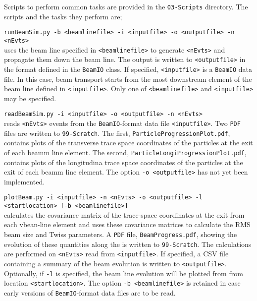 Scripts to perform common tasks are provided in
the \texttt{03-Scripts} directory.  
The scripts and the tasks they perform are;
\begin{description}
  \item{\texttt{runBeamSim.py -b <beamlinefile> -i <inputfile> -o <outputfile> -n <nEvts>}} \\
    uses the beam line specified in \texttt{<beamlinefile>} to
    generate \texttt{<nEvts>} and propagate them down the beam line.
    The output is written to \texttt{<outputfile>} in the format
    defined in the \texttt{BeamIO} class.
    If specified, \texttt{<inputfile>} is a \texttt{BeamIO} data
    file.
    In this case, beam transport starts from the most downstream
    element of the beam line defined in \texttt{<inputfile>}.
    Only one of \texttt{<beamlinefile>} and \texttt{<inputfile>} may
    be specified.
  \item{\texttt{readBeamSim.py -i <inputfile> -o <outputfile> -n <nEvts>}} \\
    reads \texttt{<nEvts>} events from the \texttt{BeamIO}-format
    data file \texttt{<inputfile>}.
    Two \texttt{PDF} files are written to \texttt{99-Scratch}.
    The first, \texttt{ParticleProgressionPlot.pdf}, contains plots of
    the transverse trace space coordinates of the particles at the
    exit of each beamm line element.
    The second, \texttt{ParticleLongiProgressionPlot.pdf}, contains
    plots of the longitudina trace space coordinates of the particles
    at the exit of each beamm line element.
    The option \texttt{-o <outputfile>} has not yet been
    implemented.
  \item{\texttt{plotBeam.py -i <inputfile> -n <nEvts> -o <outputfile> -l <startlocation> [-b <beamlinefile>]}} \\
    calculates the covariance matrix of the trace-space coordinates at
    the exit from each vbean-line element and uses these covariance
    matrices to calculate the RMS beam size and Twiss parameters.
    A \texttt{PDF} file, \texttt{BeamProgress.pdf}, showing the
    evolution of these quantities along the is written
    to \texttt{99-Scratch}.
    The calculations are performed on \texttt{<nEvts>} read
    from \texttt{<inputfile>}.
    If specified, a CSV file containing a summary of the beam
    evolution is written to \texttt{<outputfile>}.
    Optionally, if \texttt{-l} is specified, the beam line evolution
    will be plotted from from location \texttt{<startlocation>}.
    The option \texttt{-b <beamlinefile>} is retained in case early
    versions of \texttt{BeamIO}-format data files are to be read.

\end{description}
